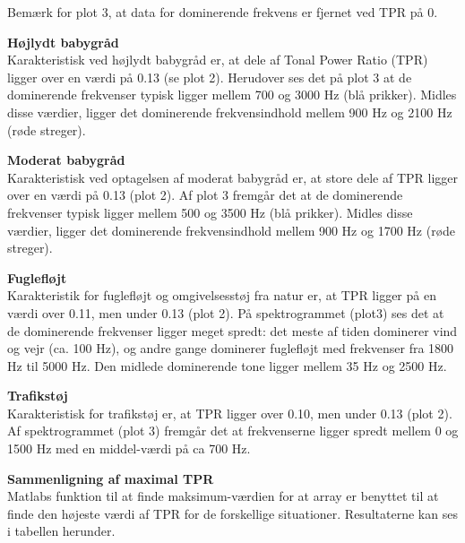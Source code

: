 Bemærk for plot 3, at data for dominerende frekvens er fjernet ved TPR på 0.


\textbf{Højlydt babygråd} \\
Karakteristisk ved højlydt babygråd er, at dele af Tonal Power Ratio (TPR) ligger over en værdi på 0.13 (se plot 2). Herudover ses det på plot 3 at de dominerende frekvenser typisk ligger mellem 700 og 3000 Hz (blå prikker). Midles disse værdier, ligger det dominerende frekvensindhold mellem 900 Hz og 2100 Hz (røde streger). 



\newpage
\textbf{Moderat babygråd}\\
Karakteristisk ved optagelsen af moderat babygråd er, at store dele af TPR ligger over en værdi på 0.13 (plot 2). Af plot 3 fremgår det at de dominerende frekvenser typisk ligger mellem 500 og 3500 Hz (blå prikker). Midles disse værdier, ligger det dominerende frekvensindhold mellem 900 Hz og 1700 Hz (røde streger). 



\newpage
\textbf{Fuglefløjt}\\
Karakteristik for fuglefløjt og omgivelsesstøj fra natur er, at TPR ligger på en værdi over 0.11, men under 0.13 (plot 2). På spektrogrammet (plot3) ses det at de dominerende frekvenser ligger meget spredt: det meste af tiden dominerer vind og vejr (ca. 100 Hz), og andre gange dominerer fuglefløjt med frekvenser fra 1800 Hz til 5000 Hz. Den midlede dominerende tone ligger mellem 35 Hz og 2500 Hz.


\newpage
\textbf{Trafikstøj}\\
Karakteristisk for trafikstøj er, at TPR ligger over 0.10, men under 0.13 (plot 2). Af spektrogrammet (plot 3) fremgår det at frekvenserne ligger spredt mellem 0 og 1500 Hz med en middel-værdi på ca 700 Hz.


\newpage
\textbf{Sammenligning af maximal TPR}	\\
Matlabs funktion til at finde maksimum-værdien for at array er benyttet til at finde den højeste værdi af TPR for de forskellige situationer. Resultaterne kan ses i tabellen herunder. 

